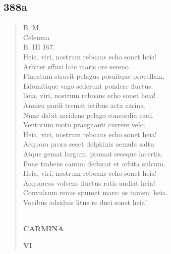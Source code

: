 \documentclass[11pt, a4paper]{report}
\begin{document}
            \subsection*{388a}
      \begin{verse}
      B. M. \\  \lbrack Celeuma \rbrack  \\ B. III 167. \\ Heia, viri, nostrum reboans echo sonet heia! \\ Arbiter effusi late maris ore sereno \\ Placatum stravit pelagus posuitque procellam, \\ Edomitique vago sederunt pondere fluctus. \\ lleia, viri, nostrum reboans echo sonet heia! \\ Annisu parili tremat ictibus acta carina. \\ Nunc dabit arridens pelago concordia caeli \\ Ventorum motu praegnanti currere velo. \\ Heia, viri, nostrum reboans echo sonet heia! \\ Aequora prora secet delphinis aemula saltu \\ Atque gemat largum, promat seseque lacertis, \\ Pone trahens canum deducat  \lbrack et orbita sulcum. \\ Heia, viri, nostrum reboans echo sonet heia! \\ Aequoreos volvens fluctus  \lbrack ratis audiat \rbrack  heia! \\ Convulsum remis spumet mare; os tamen: heia. \\ Vocibus adsiduis litus re \lbrack duci \rbrack  sonet heia! \\ 
        ﻿\pagebreak 
    \begin{center} \textbf{CARMINA} \end{center}\begin{center} \textbf{VI} \end{center}
      \end{verse}
  
            \subsection*{}
      \begin{verse}
      \end{verse}
  
\end{document}
